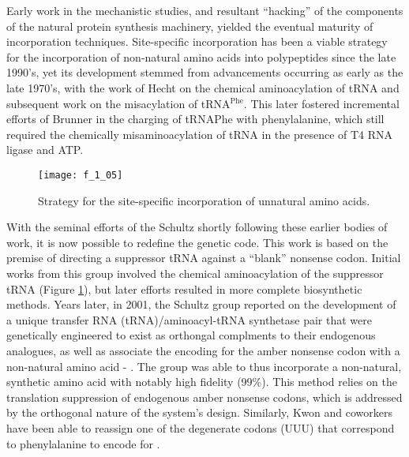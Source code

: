 \begin{refsection}
Early work in the mechanistic studies, and resultant ``hacking'' of the
components of the natural protein synthesis machinery, yielded the eventual
maturity of incorporation techniques.  Site-specific incorporation has been a
viable strategy for the incorporation of non-natural amino acids into
polypeptides since the late 1990's, yet its development stemmed from
advancements occurring as early as the late 1970's, with the work of 
Hecht on the chemical aminoacylation of tRNA and subsequent work on the
misacylation of tRNA{$^\text{Phe}$}.\cite{Heckler1984,Hecht1978} This later
fostered incremental efforts of Brunner in the charging of tRNA{$\text{Phe}$}
with phenylalanine, which
still required the chemically misaminoacylation of tRNA in the presence of T4
RNA ligase and ATP.\cite{Baldini1988}
\begin{figure}[h!] \centering \texttt{[image: f\_1\_05]}
    \caption[Strategy for the site-specific incorporation of unnatural amino
    acids.]{Strategy for the site-specific incorporation of unnatural amino
    acids.\cite{Noren1989}}\label{fig:schultz_schema} \end{figure}
With the seminal efforts of the Schultz \cite{Noren1989} shortly
following these earlier bodies of work, it is now possible to redefine the
genetic code. This work is based on the premise of directing a suppressor tRNA
against a ``blank'' nonsense codon. Initial works from this group involved the
chemical aminoacylation of the suppressor tRNA  (Figure
\ref{fig:schultz_schema}), but later efforts resulted in more complete
biosynthetic methods.
Years later, in 2001, the Schultz group reported on the development of a unique
transfer RNA (tRNA)/aminoacyl-tRNA synthetase pair that were genetically
engineered to exist as orthongal complments to their endogenous analogues, as
well as associate the encoding for the amber nonsense codon with a non-natural
amino acid - . The group was able to thus
incorporate a non-natural, synthetic amino acid with notably high fidelity
(99\%).\cite{Wang2001} This method relies on the translation suppression of
endogenous amber nonsense codons, which is addressed by the orthogonal nature of
the system's design. Similarly, Kwon and coworkers have been able to reassign
one of the degenerate codons (UUU) that correspond to phenylalanine to encode
for .\cite{Kwon2003}


\end{refsection}
